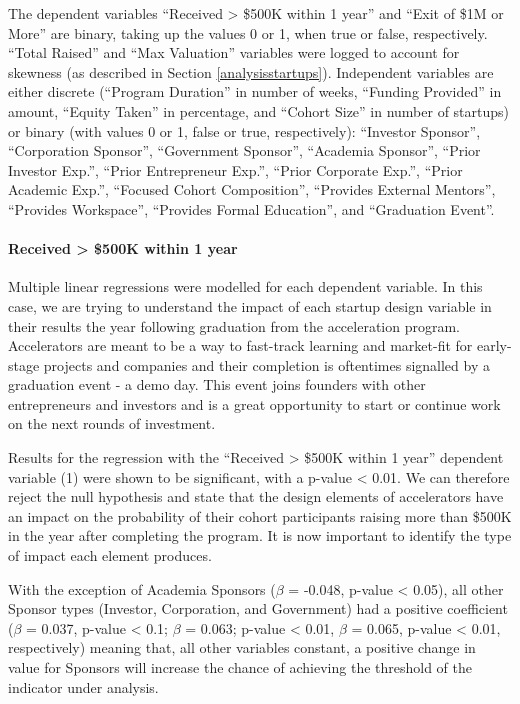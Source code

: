 \documentclass[
  12pt,
]{article}
\begin{document}
The dependent variables ``Received \textgreater{} \$500K within 1 year'' and ``Exit of \$1M or More'' are binary, taking up the values 0 or 1, when true or false, respectively. ``Total Raised'' and ``Max Valuation'' variables were logged to account for skewness (as described in Section \ref{analysisstartups}). Independent variables are either discrete (``Program Duration'' in number of weeks, ``Funding Provided'' in amount, ``Equity Taken'' in percentage, and ``Cohort Size'' in number of startups) or binary (with values 0 or 1, false or true, respectively): ``Investor Sponsor'', ``Corporation Sponsor'', ``Government Sponsor'', ``Academia Sponsor'', ``Prior Investor Exp.'', ``Prior Entrepreneur Exp.'', ``Prior Corporate Exp.'', ``Prior Academic Exp.'', ``Focused Cohort Composition'', ``Provides External Mentors'', ``Provides Workspace'', ``Provides Formal Education'', and ``Graduation Event''.

\hypertarget{received-500k-within-1-year}{%
\paragraph{Received \textgreater{} \$500K within 1 year}\label{received-500k-within-1-year}}

Multiple linear regressions were modelled for each dependent variable. In this case, we are trying to understand the impact of each startup design variable in their results the year following graduation from the acceleration program. Accelerators are meant to be a way to fast-track learning and market-fit for early-stage projects and companies and their completion is oftentimes signalled by a graduation event - a demo day. This event joins founders with other entrepreneurs and investors and is a great opportunity to start or continue work on the next rounds of investment.

Results for the regression with the ``Received \textgreater{} \$500K within 1 year'' dependent variable (1) were shown to be significant, with a p-value \textless{} 0.01. We can therefore reject the null hypothesis and state that the design elements of accelerators have an impact on the probability of their cohort participants raising more than \$500K in the year after completing the program. It is now important to identify the type of impact each element produces.

With the exception of Academia Sponsors (\(\beta\) = -0.048, p-value \textless{} 0.05), all other Sponsor types (Investor, Corporation, and Government) had a positive coefficient (\(\beta\) = 0.037, p-value \textless{} 0.1; \(\beta\) = 0.063; p-value \textless{} 0.01, \(\beta\) = 0.065, p-value \textless{} 0.01, respectively) meaning that, all other variables constant, a positive change in value for Sponsors will increase the chance of achieving the threshold of the indicator under analysis.
\end{document}
